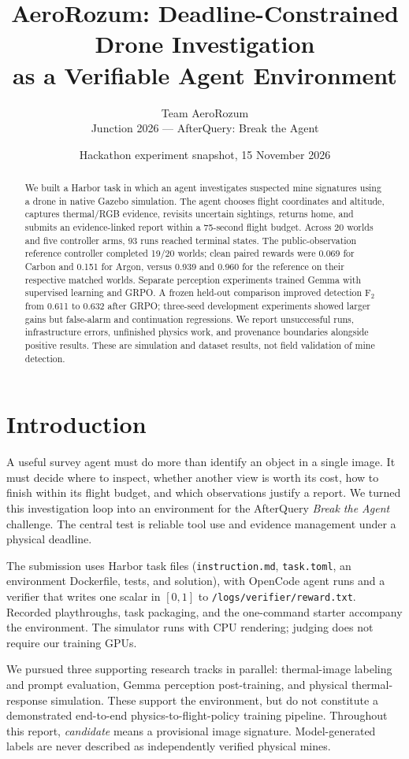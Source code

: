 \documentclass[10pt,a4paper,twocolumn]{article}
\title{AeroRozum: Deadline-Constrained Drone Investigation\\as a Verifiable Agent Environment}
\author{Team AeroRozum\\Junction 2026 --- AfterQuery: Break the Agent}
\date{Hackathon experiment snapshot, 15 November 2026}
\begin{document}
\maketitle
\begin{abstract}
We built a Harbor task in which an agent investigates suspected mine signatures using a drone in native Gazebo simulation. The agent chooses flight coordinates and altitude, captures thermal/RGB evidence, revisits uncertain sightings, returns home, and submits an evidence-linked report within a 75-second flight budget. Across 20 worlds and five controller arms, 93 runs reached terminal states. The public-observation reference controller completed 19/20 worlds; clean paired rewards were 0.069 for Carbon and 0.151 for Argon, versus 0.939 and 0.960 for the reference on their respective matched worlds. Separate perception experiments trained Gemma with supervised learning and GRPO. A frozen held-out comparison improved detection F$_2$ from 0.611 to 0.632 after GRPO; three-seed development experiments showed larger gains but false-alarm and continuation regressions. We report unsuccessful runs, infrastructure errors, unfinished physics work, and provenance boundaries alongside positive results. These are simulation and dataset results, not field validation of mine detection.
\end{abstract}

\section{Introduction}
A useful survey agent must do more than identify an object in a single image. It must decide where to inspect, whether another view is worth its cost, how to finish within its flight budget, and which observations justify a report. We turned this investigation loop into an environment for the AfterQuery \emph{Break the Agent} challenge. The central test is reliable tool use and evidence management under a physical deadline.

The submission uses Harbor task files (\texttt{instruction.md}, \texttt{task.toml}, an environment Dockerfile, tests, and solution), with OpenCode agent runs and a verifier that writes one scalar in $[0,1]$ to \texttt{/logs/verifier/reward.txt}. Recorded playthroughs, task packaging, and the one-command starter accompany the environment. The simulator runs with CPU rendering; judging does not require our training GPUs.

We pursued three supporting research tracks in parallel: thermal-image labeling and prompt evaluation, Gemma perception post-training, and physical thermal-response simulation. These support the environment, but do not constitute a demonstrated end-to-end physics-to-flight-policy training pipeline. Throughout this report, \emph{candidate} means a provisional image signature. Model-generated labels are never described as independently verified physical mines.
\end{document}

